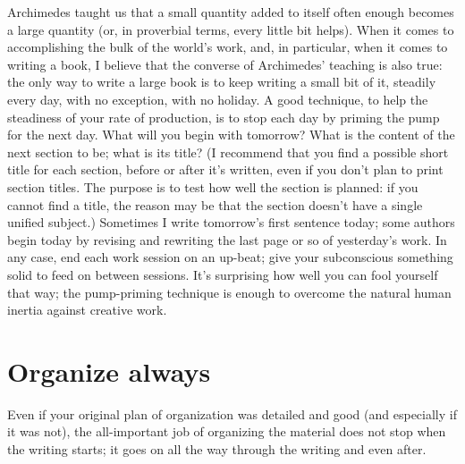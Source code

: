 \documentclass[12pt]{article}
\begin{document}
Archimedes taught us that a small quantity added to itself often enough becomes a large quantity (or, in proverbial terms, every little bit helps). When it comes to accomplishing the bulk of the world's work, and, in particular, when it comes to writing a book, I believe that the converse of Archimedes' teaching is also true: the only way to write a large book is to keep writing a small bit of it, steadily every day, with no exception, with no holiday. A good technique, to help the steadiness of your rate of production, is to stop each day by priming the pump for the next day. What will you begin with tomorrow? What is the content of the next section to be; what is its title? (I recommend that you find a possible short title for each section, before or after it's written, even if you don't plan to print section titles. The purpose is to test how well the section is planned: if you cannot find a title, the reason may be that the section doesn't have a single unified subject.) Sometimes I write tomorrow's first sentence today; some authors begin today by revising and rewriting the last page or so of yesterday's work. In any case, end each work session on an up-beat; give your subconscious something solid to feed on between sessions. It's surprising how well you can fool yourself that way; the pump-priming technique is enough to overcome the natural human inertia against creative work.

\section{Organize always}

Even if your original plan of organization was detailed and good (and especially if it was not), the all-important job of organizing the material does not stop when the writing starts; it goes on all the way through the writing and even after. 
\end{document}
